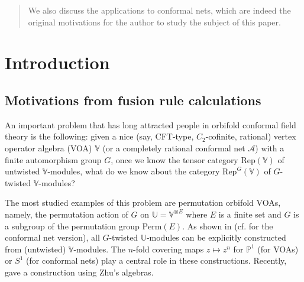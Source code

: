 \documentclass[12pt,a4paper,notitlepage]{article}
\theoremstyle{definition}
\theoremstyle{plain}
\newcommand{\mc}{\mathcal}
\newcommand{\Rep}{\mathrm{Rep}}
\newcommand{\Vbb}{\mathbb V}
\newcommand{\Ubb}{\mathbb U}
\newcommand{\Pbb}{\mathbb P}
\newcommand{\Perm}{\mathrm{Perm}}
\numberwithin{equation}{subsection}
\begin{document}
\begin{abstract}
We also discuss the applications to conformal nets, which are indeed the original motivations for the author to study the subject of this paper.
\end{abstract}

\newpage
\tableofcontents




	
	
	
	

	
	

	
	
	
	
	
	
	
	
	

	
\newpage




\section{Introduction}

\subsection{Motivations from fusion rule calculations}
An important problem that has long attracted people in orbifold conformal field theory is the following: given a nice (say, CFT-type, $C_2$-cofinite,  rational) vertex operator algebra (VOA) $\Vbb$ (or a completely rational conformal net $\mc A$) with a finite automorphism group $G$, once we know the tensor category $\Rep(\Vbb)$ of untwisted $\Vbb$-modules, what do we know about   the category $\Rep^G(\Vbb)$ of $G$-twisted $\Vbb$-modules?

The most studied examples of this problem are permutation orbifold VOAs, namely, the permutation action of $G$ on $\Ubb=\Vbb^{\otimes E}$ where $E$ is a finite set and $G$ is a subgroup of the permutation group $\Perm(E)$. As shown in \cite{BHS98,BDM02} (cf. \cite{LX04,KLX05} for the conformal net version), all $G$-twisted $\Ubb$-modules can be explicitly constructed from (untwisted) $\Vbb$-modules. The $n$-fold covering maps $z\mapsto z^n$ for $\Pbb^1$ (for VOAs) or $S^1$ (for conformal nets) play a central role in these constructions. Recently, \cite{DXY21} gave a construction using Zhu's algebras. 
\end{document}
